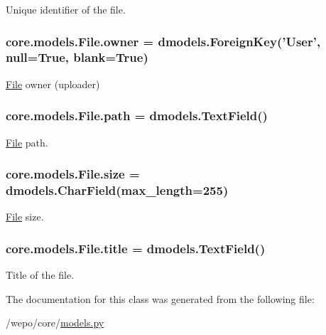 Unique identifier of the file. 

\hypertarget{classcore_1_1models_1_1File_a1925fe1551da140f13cb0295d3c250a3}{
\subsubsection[{owner}]{\setlength{\rightskip}{0pt plus 5cm}core.\-models.\-File.\-owner = dmodels.\-Foreign\-Key('{\bf User}', null=True, blank=True)\hspace{0.3cm}{\ttfamily [static]}}}\label{classcore_1_1models_1_1File_a1925fe1551da140f13cb0295d3c250a3}


\hyperlink{classcore_1_1models_1_1File}{File} owner (uploader) 

\hypertarget{classcore_1_1models_1_1File_a5e8a1bacede61e2e1f2386907e63e274}{
\subsubsection[{path}]{\setlength{\rightskip}{0pt plus 5cm}core.\-models.\-File.\-path = dmodels.\-Text\-Field()\hspace{0.3cm}{\ttfamily [static]}}}\label{classcore_1_1models_1_1File_a5e8a1bacede61e2e1f2386907e63e274}


\hyperlink{classcore_1_1models_1_1File}{File} path. 

\hypertarget{classcore_1_1models_1_1File_a18f6917981a73daa38b337f1e167c2d5}{
\subsubsection[{size}]{\setlength{\rightskip}{0pt plus 5cm}core.\-models.\-File.\-size = dmodels.\-Char\-Field(max\-\_\-length=255)\hspace{0.3cm}{\ttfamily [static]}}}\label{classcore_1_1models_1_1File_a18f6917981a73daa38b337f1e167c2d5}


\hyperlink{classcore_1_1models_1_1File}{File} size. 

\hypertarget{classcore_1_1models_1_1File_a8b5744511785ff36e1312245bb92955e}{
\subsubsection[{title}]{\setlength{\rightskip}{0pt plus 5cm}core.\-models.\-File.\-title = dmodels.\-Text\-Field()\hspace{0.3cm}{\ttfamily [static]}}}\label{classcore_1_1models_1_1File_a8b5744511785ff36e1312245bb92955e}


Title of the file. 



The documentation for this class was generated from the following file\-:\begin{DoxyCompactItemize}
\item 
/wepo/core/\hyperlink{models_8py}{models.\-py}\end{DoxyCompactItemize}
